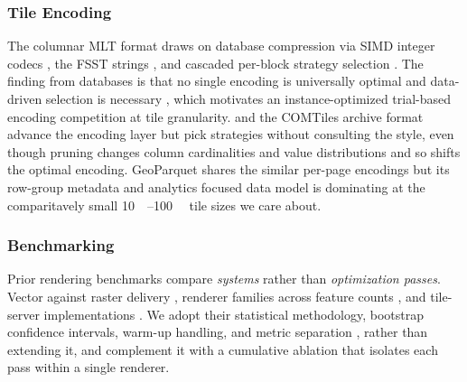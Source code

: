 \subsubsection{Tile Encoding}
The columnar \ac{MLT} format draws on database compression via SIMD integer codecs \citep{lemireDecodingBillionsIntegers2015}, the FSST strings \citep{bonczFSSTFastRandom2020}, and cascaded per-block strategy selection \citep{kuschewskiBtrBlocksEfficientColumnar2023}.
The finding from databases is that no single encoding is universally optimal and data-driven selection is necessary \citep{abadiIntegratingCompressionExecution2006,dammeComprehensiveExperimentalSurvey2019,zengEmpiricalEvaluationColumnar2023}, which motivates an instance-optimized \citep{dingSageDBInstanceOptimizedData2022,dingInstanceOptimizedDataLayouts2021} trial-based encoding competition at tile granularity.
 and the COMTiles archive format \citep{tremmelCOMTILESCASESTUDY2023} advance the encoding layer but pick strategies without consulting the style, even though pruning changes column cardinalities and value distributions and so shifts the optimal encoding.
GeoParquet shares the similar per-page encodings but its row-group metadata and analytics focused data model is dominating at the comparitavely small \qtyrange{10}{100}{\kilo\byte} tile sizes we care about.

\subsubsection{Benchmarking}
Prior rendering benchmarks compare \emph{systems} rather than \emph{optimization passes}.
Vector against raster delivery \citep{netekPerformanceTestingVector2020}, renderer families across feature counts \citep{ballaVectorDataRendering2025}, and tile-server implementations \citep{rechsteinerPerformancevergleichOpenSourceVectorTilesServerloesungenZur2024}.
We adopt their statistical methodology, bootstrap confidence intervals, warm-up handling, and metric separation \citep{georgesStatisticallyRigorousJava2007,hoeflerScientificBenchmarkingParallel2015}, rather than extending it, and complement it with a cumulative ablation that isolates each pass within a single renderer.
